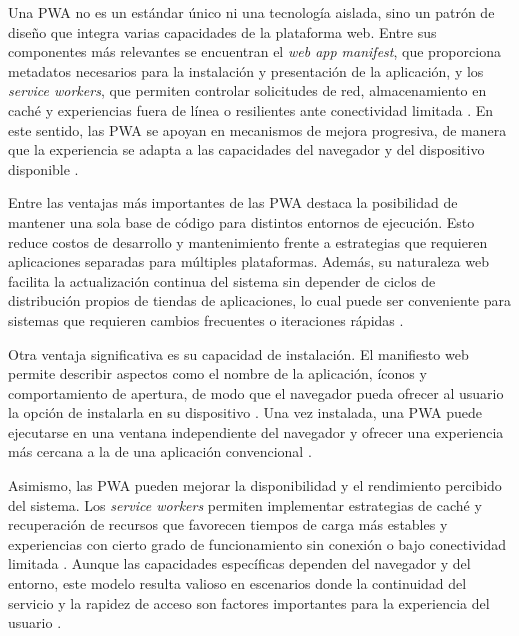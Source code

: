 \documentclass[12pt]{report}
\begin{document}
Una PWA no es un estándar único ni una tecnología aislada, sino un patrón de diseño que integra varias capacidades de la plataforma web. Entre sus componentes más relevantes se encuentran el \textit{web app manifest}, que proporciona metadatos necesarios para la instalación y presentación de la aplicación, y los \textit{service workers}, que permiten controlar solicitudes de red, almacenamiento en caché y experiencias fuera de línea o resilientes ante conectividad limitada \cite{mdn_manifest_2025,mdn_pwa_reference_2025}. En este sentido, las PWA se apoyan en mecanismos de mejora progresiva, de manera que la experiencia se adapta a las capacidades del navegador y del dispositivo disponible \cite{mdn_pwa_2025,mdn_pwa_best_practices_2025}.

Entre las ventajas más importantes de las PWA destaca la posibilidad de mantener una sola base de código para distintos entornos de ejecución. Esto reduce costos de desarrollo y mantenimiento frente a estrategias que requieren aplicaciones separadas para múltiples plataformas. Además, su naturaleza web facilita la actualización continua del sistema sin depender de ciclos de distribución propios de tiendas de aplicaciones, lo cual puede ser conveniente para sistemas que requieren cambios frecuentes o iteraciones rápidas \cite{mdn_pwa_2025,webdev_learn_pwa}.

Otra ventaja significativa es su capacidad de instalación. El manifiesto web permite describir aspectos como el nombre de la aplicación, íconos y comportamiento de apertura, de modo que el navegador pueda ofrecer al usuario la opción de instalarla en su dispositivo \cite{mdn_manifest_2025}. Una vez instalada, una PWA puede ejecutarse en una ventana independiente del navegador y ofrecer una experiencia más cercana a la de una aplicación convencional \cite{chrome_transition_apps_2023,mdn_what_is_pwa_2025}.

Asimismo, las PWA pueden mejorar la disponibilidad y el rendimiento percibido del sistema. Los \textit{service workers} permiten implementar estrategias de caché y recuperación de recursos que favorecen tiempos de carga más estables y experiencias con cierto grado de funcionamiento sin conexión o bajo conectividad limitada \cite{mdn_pwa_reference_2025,mdn_pwa_best_practices_2025}. Aunque las capacidades específicas dependen del navegador y del entorno, este modelo resulta valioso en escenarios donde la continuidad del servicio y la rapidez de acceso son factores importantes para la experiencia del usuario \cite{webdev_pwa_overview,mdn_pwa_2025}.
\end{document}
